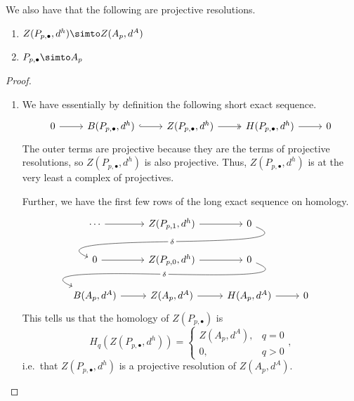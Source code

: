 \documentclass[main.tex]{subfiles}
\begin{document}
\begin{proposition}
  We also have that the following are projective resolutions.
  \begin{enumerate}
    \item $Z(P_{p,\bullet}, d^{h}) \simto Z(A_{p}, d^{A})$

    \item $P_{p,\bullet} \simto A_{p}$
  \end{enumerate}
\end{proposition}
\begin{proof}
  \leavevmode
  \begin{enumerate}
    \item We have essentially by definition the following short exact sequence.
      \begin{equation*}
        \begin{tikzcd}
          0
          \arrow[r]
          & B(P_{p, \bullet}, d^{h})
          \arrow[r, hook]
          & Z(P_{p, \bullet}, d^{h})
          \arrow[r, two heads]
          & H(P_{p, \bullet}, d^{h})
          \arrow[r]
          & 0
        \end{tikzcd}
      \end{equation*}
      The outer terms are projective because they are the terms of projective resolutions, so $Z(P_{p,\bullet}, d^{h})$ is also projective. Thus, $Z(P_{p,\bullet}, d^{h})$ is at the very least a complex of projectives.

      Further, we have the first few rows of the long exact sequence on homology.
      \begin{equation*}
        \begin{tikzcd}
          \cdots
          \arrow[r]
          & Z(P_{p, 1}, d^{h})
          \arrow[r]
          & 0
          \\
          0
          \arrow[r]
          \arrow[from=urr, out=-22, in=157, looseness=1, overlay, "\delta" description]
          & Z(P_{p, 0}, d^{h})
          \arrow[r]
          & 0
          \\
          B(A_{p}, d^{A})
          \arrow[r]
          \arrow[from=urr, out=-22, in=157, looseness=1, overlay, "\delta" description]
          & Z(A_{p}, d^{A})
          \arrow[r]
          & H(A_{p}, d^{A})
          \arrow[r]
          & 0
        \end{tikzcd}
      \end{equation*}
      This tells us that the homology of $Z(P_{p, \bullet})$ is
      \begin{equation*}
        H_{q}(Z(P_{p, \bullet}, d^{h})) =
        \begin{cases}
          Z(A_{p}, d^{A}), & q = 0 \\
          0, & q > 0
        \end{cases},
      \end{equation*}
      i.e.\ that $Z(P_{p, \bullet}, d^{h})$ is a projective resolution of $Z(A_{p}, d^{A})$.


\end{enumerate}
\end{proof}
\end{document}
